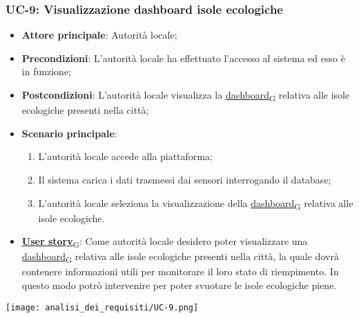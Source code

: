 \subsubsection{UC-9: Visualizzazione dashboard isole ecologiche}
\begin{itemize}
	\item \textbf{Attore principale}: Autorità locale;
	\item \textbf{Precondizioni}: L'autorità locale ha effettuato l'accesso al sistema ed esso è in funzione;
	\item \textbf{Postcondizioni}: L'autorità locale visualizza la \href{https://7last.github.io/docs/rtb/documentazione-interna/glossario\#dashboard}{dashboard\textsubscript{G}} relativa
	      alle isole ecologiche presenti nella città;
	\item \textbf{Scenario principale}:
	      \begin{enumerate}
		      \item L'autorità locale accede alla piattaforma;
		      \item Il sistema carica i dati trasmessi dai sensori interrogando il database;
		      \item L'autorità locale seleziona la visualizzazione della \href{https://7last.github.io/docs/rtb/documentazione-interna/glossario\#dashboard}{dashboard\textsubscript{G}} relativa alle isole ecologiche.
	      \end{enumerate}
	\item \href{https://7last.github.io/docs/rtb/documentazione-interna/glossario\#user-story}{\textbf{User story}\textsubscript{G}}:
	      Come autorità locale desidero poter visualizzare una \href{https://7last.github.io/docs/rtb/documentazione-interna/glossario\#dashboard}{dashboard\textsubscript{G}} relativa alle isole ecologiche presenti nella città, la quale
	      dovrà contenere informazioni utili per monitorare il loro stato di riempimento. In questo modo potrò intervenire
	      per poter svuotare le isole ecologiche piene.
\end{itemize}
\begin{center}
	\texttt{[image: analisi\_dei\_requisiti/UC-9.png]}
\end{center}

